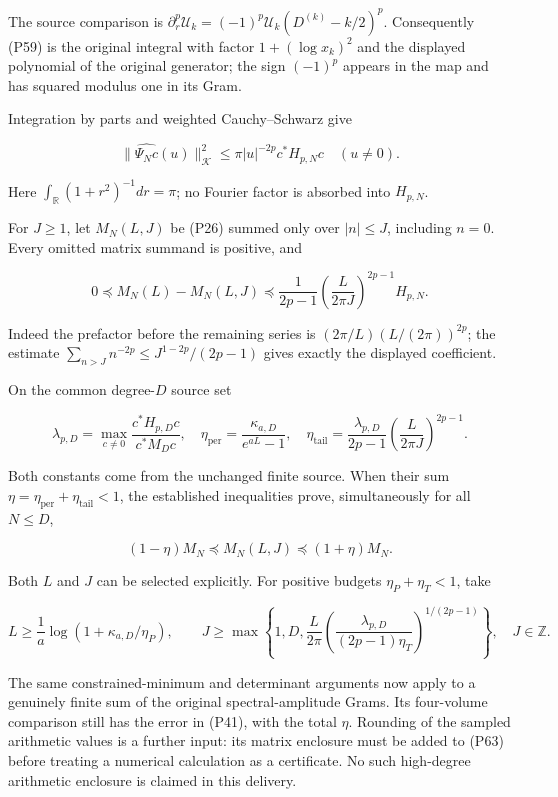 \documentclass[
]{article}
\begin{document}
The source comparison is
\(\partial_r^p\mathcal U_k=(-1)^p\mathcal U_k(D^{(k)}-k/2)^p\).
Consequently (P59) is the original integral with factor
\(1+(\log x_k)^2\) and the displayed polynomial of the original
generator; the sign \((-1)^p\) appears in the map and has squared
modulus one in its Gram.

Integration by parts and weighted Cauchy--Schwarz give

\[
\|\widehat{\Psi_Nc}(u)\|_{\mathcal K}^2
\le \pi |u|^{-2p}c^*H_{p,N}c\quad(u\ne0).
\tag{P60}
\]

Here \(\int_{\mathbb R}(1+r^2)^{-1}dr=\pi\); no Fourier factor is
absorbed into \(H_{p,N}\).

For \(J\ge1\), let \(M_N(L,J)\) be (P26) summed only over \(|n|\le J\),
including \(n=0\). Every omitted matrix summand is positive, and

\[
\boxed{
0\preceq M_N(L)-M_N(L,J)
\preceq\frac1{2p-1}
\left(\frac{L}{2\pi J}\right)^{2p-1}H_{p,N}.}
\tag{P61}
\]

Indeed the prefactor before the remaining series is
\((2\pi/L)(L/(2\pi))^{2p}\); the estimate
\(\sum_{n>J}n^{-2p}\le J^{1-2p}/(2p-1)\) gives exactly the displayed
coefficient.

On the common degree-\(D\) source set

\[
\lambda_{p,D}=\max_{c\ne0}\frac{c^*H_{p,D}c}{c^*M_Dc},\quad
\eta_{\mathrm{per}}=\frac{\kappa_{a,D}}{e^{aL}-1},\quad
\eta_{\mathrm{tail}}=\frac{\lambda_{p,D}}{2p-1}
\left(\frac{L}{2\pi J}\right)^{2p-1}.
\tag{P62}
\]

Both constants come from the unchanged finite source. When their sum
\(\eta=\eta_{\mathrm{per}}+\eta_{\mathrm{tail}}<1\), the established
inequalities prove, simultaneously for all \(N\le D\),

\[
(1-\eta)M_N\preceq M_N(L,J)\preceq(1+\eta)M_N.
\tag{P63}
\]

Both \(L\) and \(J\) can be selected explicitly. For positive budgets
\(\eta_P+\eta_T<1\), take

\[
L\ge\frac1a\log(1+\kappa_{a,D}/\eta_P),\qquad
J\ge\max\left\{1,D,
\frac L{2\pi}
\left(\frac{\lambda_{p,D}}{(2p-1)\eta_T}\right)^{1/(2p-1)}
\right\},\quad J\in\mathbb Z.
\tag{P64}
\]

The same constrained-minimum and determinant arguments now apply to a
genuinely finite sum of the original spectral-amplitude Grams. Its
four-volume comparison still has the error in (P41), with the total
\(\eta\). Rounding of the sampled arithmetic values is a further input:
its matrix enclosure must be added to (P63) before treating a numerical
calculation as a certificate. No such high-degree arithmetic enclosure
is claimed in this delivery.
\end{document}
